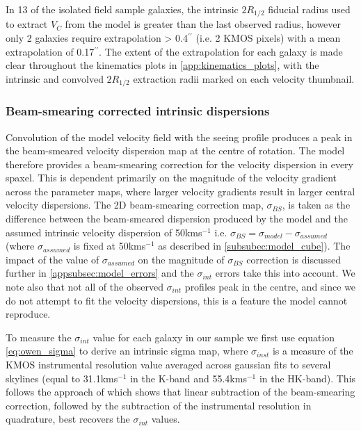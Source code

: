 \documentclass[fleqn,usenatbib]{mn2e}
\begin{document}
In 13 of the isolated field sample galaxies, the intrinsic $2R_{1/2}$ fiducial radius used to extract $V_{C}$ from the model is greater than the last observed radius, however only 2 galaxies require extrapolation > 0.4$^{\prime\prime}$ (i.e. 2 KMOS pixels) with a mean extrapolation of 0.17$^{\prime\prime}$.
The extent of the extrapolation for each galaxy is made clear throughout the kinematics plots in \cref{app:kinematics_plots}, with the intrinsic and convolved $2R_{1/2}$ extraction radii marked on each velocity thumbnail.

\subsubsection{Beam-smearing corrected intrinsic dispersions}\label{subsubsec:beam_smearing_corrected_dispersions}
Convolution of the model velocity field with the seeing profile produces a peak in the beam-smeared velocity dispersion map at the centre of rotation.
The model therefore provides a beam-smearing correction for the velocity dispersion in every spaxel.
This is dependent primarily on the magnitude of the velocity gradient across the parameter maps, where larger velocity gradients result in larger central velocity dispersions.
The 2D beam-smearing correction map, $\sigma_{BS}$, is taken as the difference between the beam-smeared dispersion produced by the model and the assumed intrinsic velocity dispersion of 50kms$^{-1}$ i.e. $\sigma_{BS} = \sigma_{model} - \sigma_{assumed}$ (where $\sigma_{assumed}$ is fixed at 50kms$^{-1}$ as described in \cref{subsubec:model_cube}).
The impact of the value of $\sigma_{assumed}$ on the magnitude of $\sigma_{BS}$ correction is discussed further in \cref{appsubsec:model_errors} and the $\sigma_{int}$ errors take this into account.
We note also that not all of the observed $\sigma_{int}$ profiles peak in the centre, and since we do not attempt to fit the velocity dispersions, this is a feature the model cannot reproduce. 

To measure the $\sigma_{int}$ value for each galaxy in our sample we first use equation \ref{eq:owen_sigma} to derive an intrinsic sigma map, where $\sigma_{inst}$ is a measure of the KMOS instrumental resolution value averaged across gaussian fits to several skylines (equal to 31.1kms$^{-1}$ in the K-band and 55.4kms$^{-1}$ in the HK-band).
This follows the approach of \cite{Stott2016} which shows that linear subtraction of the beam-smearing correction, followed by the subtraction of the instrumental resolution in quadrature, best recovers the $\sigma_{int}$ values. 
\end{document}
